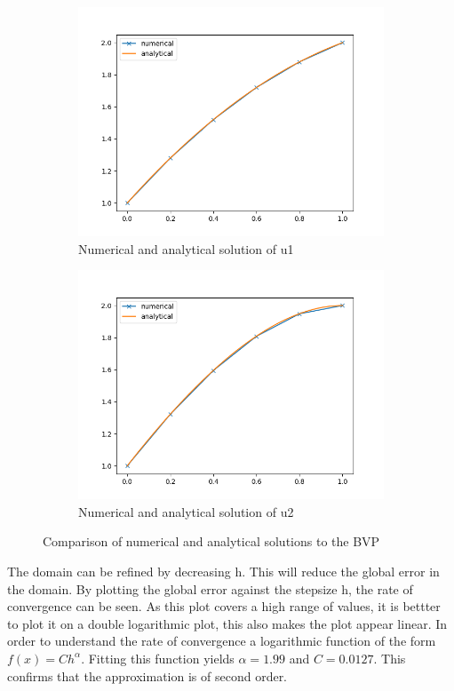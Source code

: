 \documentclass{article}
\begin{document}
\begin{figure}[H]
    \begin{subfigure}{.5\textwidth}
      \centering
      \includegraphics[width=.9\linewidth]{u1sym.png}
      \caption{Numerical and analytical solution of u1}
    \end{subfigure}%
    \begin{subfigure}{.5\textwidth}
      \centering
      \includegraphics[width=.9\linewidth]{u2sym.png}
      \caption{Numerical and analytical solution of u2}
    \end{subfigure}
    \caption{Comparison of numerical and analytical solutions to the BVP}
\end{figure}
The domain can be refined by decreasing h. This will reduce the global error in the domain. By plotting the global error against the stepsize h, the rate of convergence can be seen. As this plot covers a high range of values, it is bettter to plot it on a double logarithmic plot, this also makes the plot appear linear. In order to understand the rate of convergence a logarithmic function of the form $f(x) = Ch^{\alpha}$. Fitting this function yields $\alpha=1.99$ and $C = 0.0127$. This confirms that the approximation is of second order.
\end{document}
